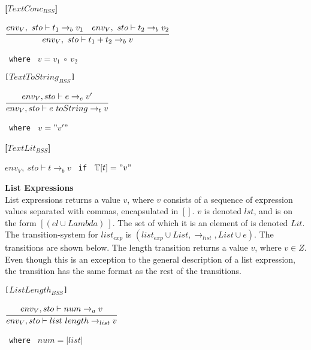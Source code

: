 {\textbf{[$TextConc_{BSS}$]}\\
\begin{center}
	\begin{math}
	\cfrac
		{env_V,\ sto \vdash t_1 \rightarrow_b v_1 \quad env_V,\ sto \vdash t_2 \rightarrow_b v_2}
		{env_V,\ sto \vdash t_1 + t_2 \rightarrow_b v}
	\end{math}
	
	\texttt{ where } $v = v_1\ \circ\ v_2$
\end{center}

\texttt{[$TextToString_{BSS}$]}\\
\begin{center}
	\begin{math}
		\cfrac
			{env_V, sto \vdash e \rightarrow_{e} v'}
			{env_V, sto \vdash e\ toString \rightarrow_{t} v}
	\end{math}
	
	\texttt{ where } $v = "v'"$
\end{center}

\textbf{[$TextLit_{BSS}$]}\\
\begin{center}
	\begin{math}
	env_V,\ sto \vdash t \rightarrow_b v
	\end{math}
	\texttt{ if } $\mathbb{T}[t] = "v"$
\end{center}

\textbf{\Large{List Expressions}}\\
List expressions returns a value $v$, where $v$ consists of a sequence of expression values separated with commas, encapsulated in $[]$.
$v$ is denoted $lst$, and is on the form $[(el \cup Lambda)~]$.
The set of which it is an element of is denoted $Lit$.
The transition-system for $list_{exp}$ is $(list_{exp} \cup List, \rightarrow_{list}, List \cup e)$.
The transitions are shown below.
The length transition returns a value $v$, where $v \in Z$.
Even though this is an exception to the general description of a list expression, the transition has the same format as the rest of the transitions.

\texttt{[$ListLength_{BSS}$]}\\
\begin{center}
	\begin{math}
		\cfrac
			{env_V, sto \vdash num \rightarrow_{a} v}
			{env_V, sto \vdash list\ length \rightarrow_{list} v}
	\end{math}
	
	\texttt{ where } $num = |list|$
\end{center}

}
